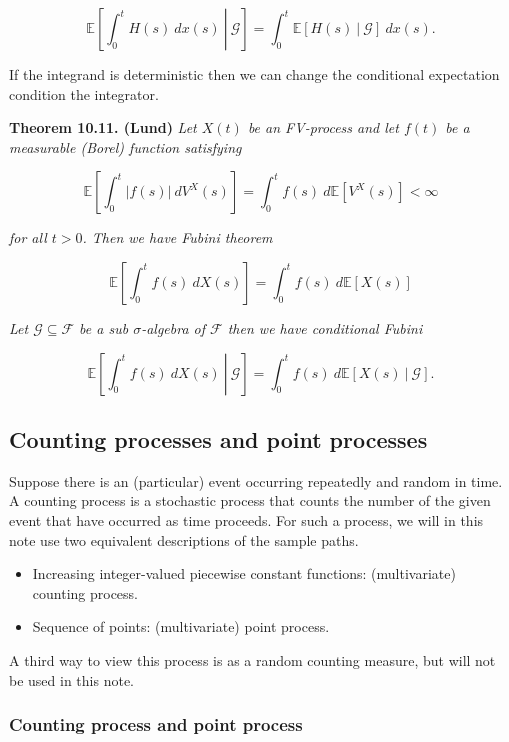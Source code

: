\documentclass[a4paper,10pt,openany]{book}
\providecommand{\tightlist}{%
 \setlength{\itemsep}{0pt}\setlength{\parskip}{0pt}}
\begin{document}
\[
\mathbb E\left[\left.\int_0^t H(s)\ dx(s)\ \right\vert\ \mathcal G\right]=\int_0^t \mathbb E[ H(s)\ \vert\ \mathcal G]\ dx(s).
\]

If the integrand is deterministic then we can change the conditional expectation condition the integrator.

\textbf{Theorem 10.11. (Lund)} \emph{Let \(X(t)\) be an FV-process and let \(f(t)\) be a measurable (Borel) function satisfying}

\[
\mathbb E\left[\int_0^t \vert f(s)\vert \ dV^X(s)\right]=\int_0^t f(s)\ d\mathbb E[V
^X(s)] <\infty
\]

\emph{for all \(t>0\). Then we have Fubini theorem}

\[
\mathbb E\left[\int_0^t f(s)\ dX(s)\right]=\int_0^t f(s)\ d\mathbb E[X(s)]
\]

\emph{Let \(\mathcal G \subseteq\mathcal F\) be a sub \(\sigma\)-algebra of \(\mathcal F\) then we have conditional Fubini}

\[
\mathbb E\left[\left.\int_0^t f(s)\ dX(s)\ \right\vert\ \mathcal G\right]=\int_0^t f(s)\ d\mathbb E[ X(s)\ \vert\ \mathcal G].
\]

\hypertarget{counting-processes-and-point-processes}{%
\subsection{Counting processes and point processes}\label{counting-processes-and-point-processes}}

Suppose there is an (particular) event occurring repeatedly and random in time. A counting process is a stochastic process that counts the number of the given event that have occurred as time proceeds. For such a process, we will in this note use two equivalent descriptions of the sample paths.

\begin{itemize}
\tightlist
\item
  Increasing integer-valued piecewise constant functions: (multivariate) counting process.
\item
  Sequence of points: (multivariate) point process.
\end{itemize}

A third way to view this process is as a random counting measure, but will not be used in this note.

\hypertarget{counting-process-and-point-process}{%
\subsubsection{Counting process and point process}\label{counting-process-and-point-process}}
\end{document}
